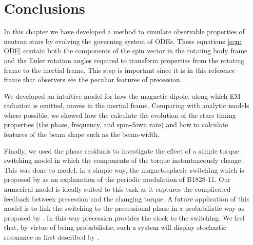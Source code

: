\documentclass[../full_thesis/full_thesis.tex]{subfiles}
\begin{document}
\section{Conclusions}

In this chapter we have developed a method to simulate observable properties of
neutron stars by evolving the governing system of ODEs. These equations
\eqref{eqn: ODE} contain both the components of the spin vector in the rotating
body frame and the Euler rotation angles required to transform properties from
the rotating frame to the inertial frame. This step is important since it is in
this reference frame that observers see the peculiar features of precession.

We developed an intuitive model for how the magnetic dipole, along
which EM radiation is emitted, moves in the inertial frame. Comparing with
analytic models where possible, we showed how the calculate the evolution of
the stars timing properties (the phase, frequency, and spin-down rate) and how
to calculate features of the beam shape such as the beam-width.

Finally, we used the phase residuals to investigate the effect of a simple torque
switching model in which the components of the torque instantaneously change.
This was done to model, in a simple way, the magnetospheric switching which is
proposed by \citet{Lyne2010} as an explanation of the periodic modulation of
B1828-11. Our numerical model is ideally suited to this task as it captures the
complicated feedback between precession and the changing torque.
A future application of this model is to link the switching to the precessional
phase in a probabilistic way as proposed by \citet{Jones2012}. In this way
precession provides the clock to the switching. We feel that, by virtue of
being probabilistic, such a system will display stochastic resonance as first
described by \citet{Cordes2013}.

\biblio
\end{document}
